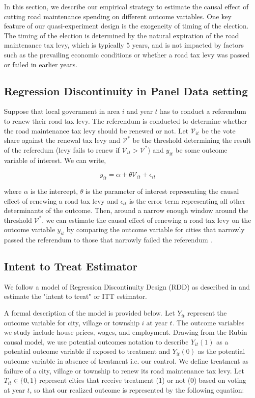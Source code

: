 In this section, we describe our empirical strategy to estimate the causal effect of cutting road maintenance spending on different outcome variables. One key feature of our quasi-experiment design is the exogeneity of timing of the election. The timing of the election is determined by the natural expiration of the road maintenance tax levy, which is typically 5 years, and is not impacted by factors such as the prevailing economic conditions or whether a road tax levy was passed or failed in earlier years.

\subsection{Regression Discontinuity in Panel Data setting}

Suppose that local government in area $i$ and year $t$ has to conduct a referendum to renew their road tax levy. The referendum is conducted to determine whether the road maintenance tax levy should be renewed or not. Let $\mathcal{V}_{it}$ be the vote share against the renewal tax levy and  $\mathcal{V}^*$ be the threshold determining the result of the referedum (levy fails to renew if $\mathcal{V}_{it} > \mathcal{V}^*$) and $y_{it}$ be some outcome variable of interest. We can write,

$$
y_{it} = \alpha + \theta \mathcal{V}_{it} + \epsilon_{it}
$$

where $\alpha$ is the intercept, $\theta$ is the parameter of interest representing the causal effect of renewing a road tax levy and $\epsilon_{it}$ is the error term representing all other determinants of the outcome. Then, around a narrow enough window around the threshold $\mathcal{V}^*$, we can estimate the causal effect of renewing a road tax levy on the outcome variable $y_{it}$ by comparing the outcome variable for cities that narrowly passed the referendum to those that narrowly failed the referendum \cite{lee_lemieux2010}.

\subsection{Intent to Treat Estimator}

We follow a model of Regression Discontinuity Design (RDD) as described in \cite{cellini2010value} and estimate the "intent to treat" or ITT estimator. 

A formal description of the model is provided below. Let $Y_{it}$ represent the outcome variable for city, village or township $i$ at year $t$. The outcome variables we study include house prices, wages, and employment. Drawing from the Rubin causal model, we use potential outcomes notation to describe $Y_{it}(1)$ as a potential outcome variable if exposed to treatment and $Y_{it}(0)$ as the potential outcome variable in absence of treatment i.e. our control. We define treatment as failure of a city, village or township to renew its road maintenance tax levy. Let $T_{it} \in \{0,1\}$ represent cities that receive treatment (1) or not (0) based on voting at year $t$, so that our realized outcome is represented by the following equation:


